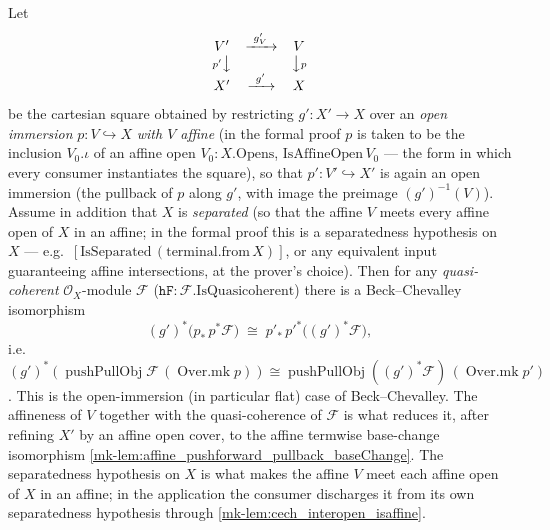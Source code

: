 \begin{lemma}\label{mk-lem:openimm_beckchevalley}
  \leanok

  Let
  \[
    \begin{array}{ccc}
      V' & \xrightarrow{\ g'_V\ } & V\\
      {\scriptstyle p'}\big\downarrow & & \big\downarrow{\scriptstyle p}\\
      X' & \xrightarrow{\ g'\ } & X
    \end{array}
  \]
  be the cartesian square obtained by restricting \(g' : X' \to X\) over an \emph{open
  immersion} \(p : V \hookrightarrow X\) \emph{with \(V\) affine} (in the formal proof \(p\) is taken to be
  the inclusion \(V_0.\iota\) of an affine open \(V_0 : X.\mathrm{Opens}\),
  \(\mathrm{IsAffineOpen}\,V_0\) --- the form in which every consumer instantiates the square),
  so that \(p' : V' \hookrightarrow X'\) is again an open immersion (the pullback of \(p\) along
  \(g'\), with image the preimage \((g')^{-1}(V)\)). Assume in addition that \(X\) is
  \emph{separated} (so that the affine \(V\) meets every affine open of \(X\) in an affine;
  in the formal proof this is a separatedness hypothesis on \(X\) --- e.g.\ \([\mathrm{IsSeparated}\,
  (\mathrm{terminal.from}\,X)]\), or any equivalent input guaranteeing affine
  intersections, at the prover's choice). Then for any \emph{quasi-coherent}
  \(\mathcal{O}_X\)-module \(\mathcal{F}\) (\(\mathtt{hF} : \mathcal{F}.\mathrm{IsQuasicoherent}\))
  there is a Beck--Chevalley isomorphism
  \[
    (g')^*\bigl(p_*\,p^*\mathcal{F}\bigr)
      \;\cong\;
    p'_*\,p'^*\bigl((g')^*\mathcal{F}\bigr),
  \]
  i.e.\ \((g')^*(\operatorname{pushPullObj}\mathcal{F}\,(\operatorname{Over.mk} p)) \cong
  \operatorname{pushPullObj}((g')^*\mathcal{F})\,(\operatorname{Over.mk} p')\). This is the
  open-immersion (in particular flat) case of Beck--Chevalley. The affineness of \(V\)
  together with the quasi-coherence of \(\mathcal{F}\) is what reduces it, after refining
  \(X'\) by an affine open cover, to the affine termwise base-change isomorphism
  \ref{mk-lem:affine_pushforward_pullback_baseChange}. The separatedness hypothesis on \(X\) is
  what makes the affine \(V\) meet each affine open of \(X\) in an affine; in the application
  the consumer discharges it from its own separatedness hypothesis through
  \ref{mk-lem:cech_interopen_isaffine}.
\end{lemma}
